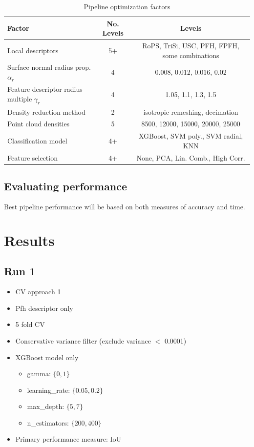 \documentclass[11pt]{article}
\theoremstyle{definition}
\begin{document}
\begin{table}[ht]
    \centering
    \caption{Pipeline optimization factors}
    \label{tab:pipeFacts}
    \begin{tabular}{l|c|c}
        \toprule
        \textbf{Factor} & \textbf{No. Levels} & \textbf{Levels} \\
        \midrule
        Local descriptors & 5+ & RoPS, TriSi, USC, PFH, FPFH, some combinations \\
        Surface normal radius prop. $\alpha_r$ & 4 & 0.008, 0.012, 0.016, 0.02 \\
        Feature descriptor radius multiple $\gamma_r$ & 4 & 1.05, 1.1, 1.3, 1.5 \\
        Density reduction method & 2 & isotropic remeshing, decimation \\
        Point cloud densities & 5 & 8500, 12000, 15000, 20000, 25000 \\
        Classification model & 4+ & XGBoost, SVM poly., SVM radial, KNN\\
        Feature selection & 4+ & None, PCA, Lin. Comb., High Corr. \\
        \bottomrule
    \end{tabular}
\end{table}

\subsection{Evaluating performance}

Best pipeline performance will be based on both measures of accuracy and time.

\newpage


\section{Results}

\subsection{Run 1}

\begin{itemize}
    \item CV approach 1
    \item Pfh descriptor only
    \item 5 fold CV
    \item Conservative variance filter (exclude variance $<$ 0.0001)
    \item XGBoost model only
    \begin{itemize}
        \item gamma: $\{0,1\}$
        \item learning\_rate: $\{0.05, 0.2\}$
        \item max\_depth: $\{5, 7\}$
        \item n\_estimators: $\{200,400\}$
    \end{itemize}
    \item Primary performance measure: IoU
\end{itemize}
\end{document}

